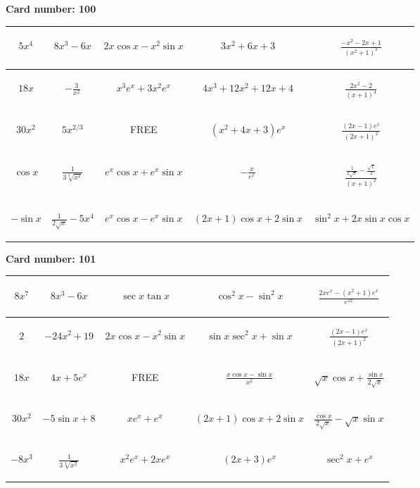 \documentclass{article}
\newcommand{\entry}[1]{\begin{minipage}[t][2.75cm][t]{4cm} \vspace{1cm} \begin{center}#1\end{center} \end{minipage}}
\newcommand{\freespace}{\entry{FREE}}
\newcommand{\cardnumber}[1]{\noindent \textbf{Card number: #1} \bigskip}
\begin{document}
\pagebreak

\cardnumber{100}
\begin{center}
\begin{tabular}{|*{5}{c|}}
    \hline
    \entry{$5x^4$} & \entry{$8x^3 - 6x$} & \entry{$2x \cos x - x^2 \sin x$} & \entry{$3x^2 + 6x + 3$} & \entry{$\frac{-x^2 - 2x + 1}{(x^2 + 1)^2}$} \\ \hline
    \entry{$18x$} & \entry{$-\frac{3}{x^2}$} & \entry{$x^3 e^x + 3x^2 e^x$} & \entry{$4x^3 + 12x^2 + 12x + 4$} & \entry{$\frac{2x^2 - 2}{(x + 1)^4}$} \\ \hline
    \entry{$30x^2$} & \entry{$5x^{2/3}$} & \freespace & \entry{$(x^2 + 4x + 3) e^x$} & \entry{$\frac{(2x - 1) e^x}{(2x + 1)^2}$} \\ \hline
    \entry{$\cos x$} & \entry{$\frac{1}{3\sqrt[3]{x^2}}$} & \entry{$e^x \cos x + e^x \sin x$} & \entry{$-\frac{x}{e^x}$} & \entry{$\frac{\frac{1}{2 \sqrt{x}} - \frac{\sqrt{x}}{2}}{(x + 1)^2}$} \\ \hline
    \entry{$-\sin x$} & \entry{$\frac{1}{2\sqrt{x}} - 5x^4$} & \entry{$e^x \cos x - e^x \sin x$} & \entry{$(2x + 1) \cos x + 2 \sin x$} & \entry{$\sin^2 x + 2x \sin x \cos x$} \\ \hline
\end{tabular}
\end{center}

\pagebreak

\cardnumber{101}
\begin{center}
\begin{tabular}{|*{5}{c|}}
    \hline
    \entry{$8x^7$} & \entry{$8x^3 - 6x$} & \entry{$\sec x \tan x$} & \entry{$\cos^2 x - \sin^2 x$} & \entry{$\frac{2x e^x - (x^2 + 1) e^x}{e^{2x}}$} \\ \hline
    \entry{$2$} & \entry{$-24x^2 + 19$} & \entry{$2x \cos x - x^2 \sin x$} & \entry{$\sin x \sec^2 x + \sin x$} & \entry{$\frac{(2x - 1) e^x}{(2x + 1)^2}$} \\ \hline
    \entry{$18x$} & \entry{$4x + 5e^x$} & \freespace & \entry{$\frac{x \cos x - \sin x}{x^2}$} & \entry{$\sqrt{x} \cos x + \frac{\sin x}{2 \sqrt{x}}$} \\ \hline
    \entry{$30x^2$} & \entry{$-5 \sin x + 8$} & \entry{$x e^x + e^x$} & \entry{$(2x + 1) \cos x + 2 \sin x$} & \entry{$\frac{\cos x}{2 \sqrt{x}} - \sqrt{x} \sin x$} \\ \hline
    \entry{$-8x^3$} & \entry{$\frac{1}{3\sqrt[3]{x^2}}$} & \entry{$x^2 e^x + 2x e^x$} & \entry{$(2x + 3) e^x$} & \entry{$\sec^2 x + e^x$} \\ \hline
\end{tabular}
\end{center}
\end{document}
